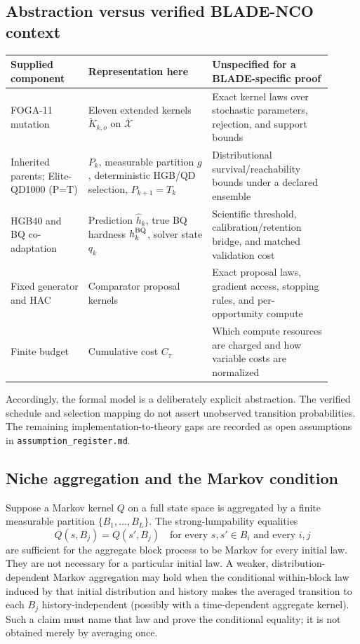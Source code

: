 \subsection{Abstraction versus verified BLADE-NCO context}
\begin{center}
\begin{tabular}{>{\raggedright\arraybackslash}p{0.22\linewidth}>{\raggedright\arraybackslash}p{0.35\linewidth}>{\raggedright\arraybackslash}p{0.34\linewidth}}
\toprule
Supplied component & Representation here & Unspecified for a BLADE-specific proof \\
\midrule
FOGA-11 mutation & Eleven extended kernels $\widetilde K_{k,o}$ on $\overline{\mathcal X}$ & Exact kernel laws over stochastic parameters, rejection, and support bounds \\
Inherited parents; Elite-QD1000 (P=T) & $P_k$, measurable partition $g$, deterministic HGB/QD selection, $P_{k+1}=T_k$ & Distributional survival/reachability bounds under a declared ensemble \\
HGB40 and BQ co-adaptation & Prediction $\widehat h_k$, true BQ hardness $h_k^{\rm BQ}$, solver state $q_k$ & Scientific threshold, calibration/retention bridge, and matched validation cost \\
Fixed generator and HAC & Comparator proposal kernels & Exact proposal laws, gradient access, stopping rules, and per-opportunity compute \\
Finite budget & Cumulative cost $C_\tau$ & Which compute resources are charged and how variable costs are normalized \\
\bottomrule
\end{tabular}
\end{center}
Accordingly, the formal model is a deliberately explicit abstraction. The
verified schedule and selection mapping do not assert unobserved transition
probabilities. The remaining implementation-to-theory gaps are recorded as open
assumptions in \texttt{assumption\_register.md}.

\subsection{Niche aggregation and the Markov condition}
Suppose a Markov kernel $Q$ on a full state space is aggregated by a finite
measurable partition $\{B_1,\ldots,B_L\}$. The strong-lumpability equalities
\[
 Q(s,B_j)=Q(s',B_j)\quad
 \text{for every }s,s'\in B_i\text{ and every }i,j
\]
are sufficient for the aggregate block process to be Markov for every initial
law. They are not necessary for a particular initial law. A weaker,
distribution-dependent Markov aggregation may hold when the conditional
within-block law induced by that initial distribution and history makes the
averaged transition to each $B_j$ history-independent (possibly with a
time-dependent aggregate kernel). Such a claim must name that law and prove
the conditional equality; it is not obtained merely by averaging once.

